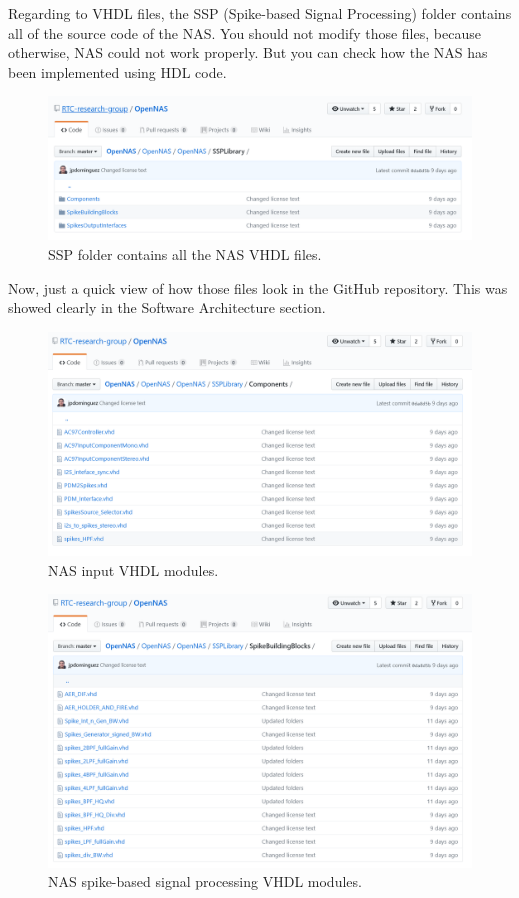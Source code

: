 Regarding to VHDL files, the SSP (Spike-based Signal Processing) folder contains all of the source code of the NAS. You should not modify those files, because otherwise, NAS could not work properly. But you can check how the NAS has been implemented using HDL code. 

\begin{figure}[H]
\centering
\includegraphics[width=1\textwidth]{images/Img06_SSP.PNG}
\caption{\label{fig:OpenNAS_SSPFolder}SSP folder contains all the NAS VHDL files.}
\end{figure}

Now, just a quick view of how those files look in the GitHub repository. This was showed clearly in the Software Architecture section.

\begin{figure}[H]
\centering
\includegraphics[width=1\textwidth]{images/Img07_Components.PNG}
\caption{\label{fig:OpenNAS_SSP_Components}NAS input VHDL modules.}
\end{figure}

\begin{figure}[H]
\centering
\includegraphics[width=1\textwidth]{images/Img08_SpikeBuildingBlocks.PNG}
\caption{\label{fig:OpenNAS_SSP_SpikesBuildingBlock}NAS spike-based signal processing VHDL modules.}
\end{figure}


